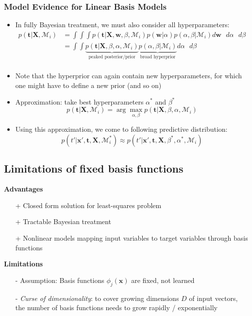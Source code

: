 \subsubsection{Model Evidence for Linear Basis Models}
\begin{itemize}
	\item In fully Bayesian treatment, we must also consider all hyperparameters:
	\begin{equation*}
		\begin{split}
			p\left(\bm{t}|\bm{X}, \mathcal{M}_i\right) & =\int\int\int p\left(\bm{t}|\bm{X},\bm{w},\beta,\mathcal{M}_i\right)p\left(\bm{w}|\alpha\right)p\left(\alpha, \beta | \mathcal{M}_i\right)d\bm{w}\text{ }d\alpha\text{ }d\beta\\
			& = \int\int \underbrace{p\left(\bm{t}|\bm{X}, \beta, \alpha, \mathcal{M}_i\right)}_{\text{peaked posterior/prior}} \underbrace{p\left(\alpha, \beta | \mathcal{M}_i\right)}_{\text{broad hyperprior}} d\alpha \text{ }d\beta\\
		\end{split}
	\end{equation*}
	\item Note that the hyperprior can again contain new hyperparameters, for which one might have to define a new prior (and so on)
	\item Approximation: take best hyperparameters $\alpha^*$ and $\beta^*$
	$$p\left(\bm{t}|\bm{X}, \mathcal{M}_i\right) = \arg\max_{\alpha, \beta} p\left(\bm{t}|\bm{X}, \beta, \alpha, \mathcal{M}_i\right)$$
	\item Using this approximation, we come to following predictive distribution:
	$$p\left(t'|\bm{x}',\bm{t}, \bm{X}, \mathcal{M}_i^*\right) \approx p\left(t'|\bm{x}',\bm{t}, \bm{X}, \beta^*, \alpha^*, \mathcal{M}_i\right)$$
\end{itemize}
\subsection{Limitations of fixed basis functions}
\textbf{Advantages}
\begin{itemize}
	\item[+] Closed form solution for least-squares problem 
	\item[+] Tractable Bayesian treatment
	\item[+] Nonlinear models mapping input variables to target variables through basis functions
\end{itemize}
\textbf{Limitations}
\begin{itemize}
	\item[-] Assumption: Basis functions $\phi_j(\bm{x})$ are fixed, not learned
	\item[-] \textit{Curse of dimensionality}: to cover growing dimensions $D$ of input vectors, the number of basis functions needs to grow rapidly / exponentially
\end{itemize}
